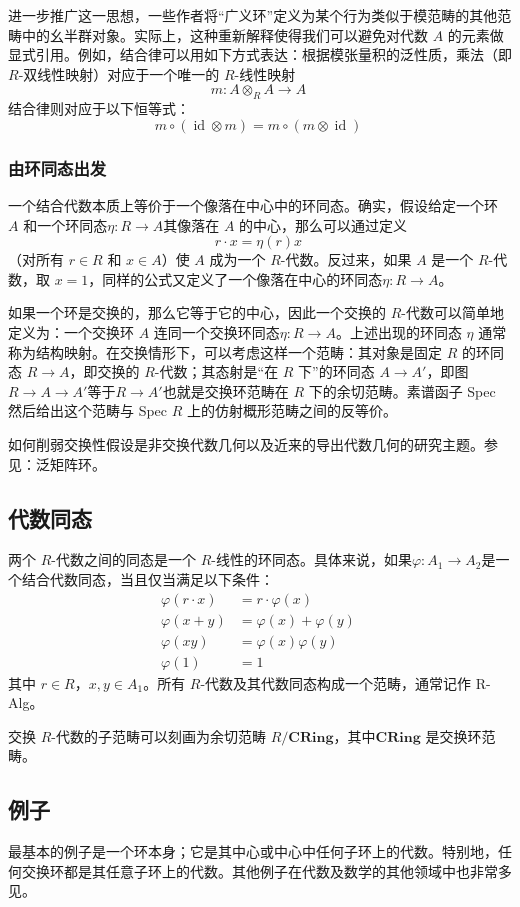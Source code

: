 进一步推广这一思想，一些作者将“广义环”定义为某个行为类似于模范畴的其他范畴中的幺半群对象。实际上，这种重新解释使得我们可以避免对代数 $A$ 的元素做显式引用。例如，结合律可以用如下方式表达：根据模张量积的泛性质，乘法（即 $R$-双线性映射）对应于一个唯一的 $R$-线性映射
$$
m: A \otimes_R A \to A~
$$
结合律则对应于以下恒等式：
$$
m \circ (\operatorname{id} \otimes m) = m \circ (m \otimes \operatorname{id})~
$$
\subsubsection{由环同态出发}
一个结合代数本质上等价于一个像落在中心中的环同态。确实，假设给定一个环 $A$ 和一个环同态$\eta : R \to A$其像落在 $A$ 的中心，那么可以通过定义
$$
r \cdot x = \eta(r) x~
$$
（对所有 $r \in R$ 和 $x \in A$）使 $A$ 成为一个 $R$-代数。反过来，如果 $A$ 是一个 $R$-代数，取 $x = 1$，同样的公式又定义了一个像落在中心的环同态$
\eta : R \to A$。

如果一个环是交换的，那么它等于它的中心，因此一个交换的 $R$-代数可以简单地定义为：一个交换环 $A$ 连同一个交换环同态$\eta : R \to A$。上述出现的环同态 $\eta$ 通常称为结构映射。在交换情形下，可以考虑这样一个范畴：其对象是固定 $R$ 的环同态 $R \to A$，即交换的 $R$-代数；其态射是“在 $R$ 下”的环同态 $A \to A'$，即图$R \to A \to A'$等于$R \to A'$也就是交换环范畴在 $R$ 下的余切范畴。素谱函子 Spec 然后给出这个范畴与 Spec $R$ 上的仿射概形范畴之间的反等价。

如何削弱交换性假设是非交换代数几何以及近来的导出代数几何的研究主题。参见：泛矩阵环。
\subsection{代数同态}
两个 $R$-代数之间的同态是一个 $R$-线性的环同态。具体来说，如果$\varphi : A_1 \to A_2$是一个结合代数同态，当且仅当满足以下条件：
$$
\begin{aligned}
\varphi(r \cdot x) &= r \cdot \varphi(x)\\
\varphi(x + y) &= \varphi(x) + \varphi(y)\\
\varphi(xy) &= \varphi(x)\varphi(y)\\
\varphi(1) &= 1
\end{aligned}~
$$
其中 $r \in R$，$x, y \in A_1$。所有 $R$-代数及其代数同态构成一个范畴，通常记作 R-Alg。

交换 $R$-代数的子范畴可以刻画为余切范畴 $R / \mathbf{CRing}$，其中$\mathbf{CRing}$ 是交换环范畴。
\subsection{例子}
最基本的例子是一个环本身；它是其中心或中心中任何子环上的代数。特别地，任何交换环都是其任意子环上的代数。其他例子在代数及数学的其他领域中也非常多见。
